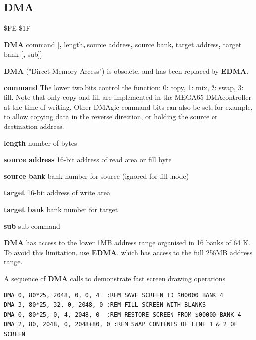 \subsection{DMA}
\label{BASIC 65 Commands!DMA}
\begin{description}[leftmargin=2cm,style=nextline]
\item [Token:] \$FE \$1F
\item [Format:] {\bf DMA} command [{\bf,} length{\bf,} source address{\bf,}
                 source bank{\bf,} target address{\bf,} target bank
                 [{\bf,} sub]]
\item [Usage:]
   {\bf DMA} ("Direct Memory Access") is obsolete,
   and has been replaced by {\bf EDMA}.

   {\bf command} The lower two bits control the function: 0: copy, 1: mix, 2: swap, 3: fill. Note that only copy and fill are implemented in the MEGA65 DMAcontroller at the time of writing.  Other DMAgic command bits can also be set, for example, to allow copying data in the reverse direction, or holding the source or destination address.

   {\bf length} number of bytes

   {\bf source address} 16-bit address of read area or fill byte

   {\bf source bank} bank number for source (ignored for fill mode)

   {\bf target} 16-bit address of write area

   {\bf target bank} bank number for target

   {\bf sub} sub command

\item [Remarks:]
{\bf DMA} has access to the lower 1MB address range
organised in 16 banks of 64 K. To avoid this limitation, use
{\bf EDMA}, which has access to the full 256MB address range.

\item [Examples:] A sequence of {\bf DMA} calls to demonstrate fast screen drawing operations
\begin{tcolorbox}[colback=black,coltext=white]
\verbatimfont{\codefont}
\begin{verbatim}
DMA 0, 80*25, 2048, 0, 0, 4  :REM SAVE SCREEN TO $00000 BANK 4
DMA 3, 80*25, 32, 0, 2048, 0 :REM FILL SCREEN WITH BLANKS
DMA 0, 80*25, 0, 4, 2048, 0  :REM RESTORE SCREEN FROM $00000 BANK 4
DMA 2, 80, 2048, 0, 2048+80, 0 :REM SWAP CONTENTS OF LINE 1 & 2 OF SCREEN
\end{verbatim}
\end{tcolorbox}
\end{description}


